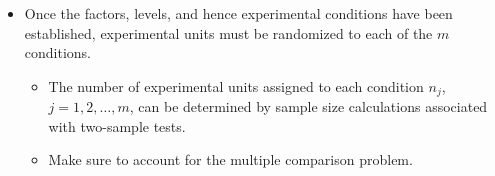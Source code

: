 \begin{itemize}
\begin{itemize}
\begin{enumerate}[1.]
                        \end{enumerate}
            \end{itemize}
      \item Once the factors, levels, and hence experimental conditions have been established, experimental units
            must be randomized to each of the $m$ conditions.
            \begin{itemize}
                  \item The number of experimental units assigned to each condition $ n_j $, $ j=1,2,\ldots,m $, can
                        be determined by sample size calculations associated with two-sample tests.
                  \item Make sure to account for the multiple comparison problem.
            \end{itemize}
\end{itemize}

